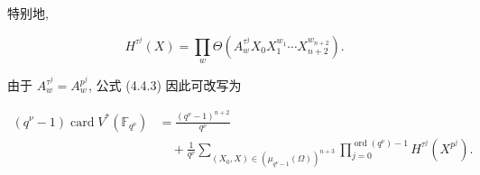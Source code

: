 特别地,

\[
H^{\tau^j}(X)=\prod_w
\Theta\!\left(A_w^{\tau^j}X_0X_1^{w_1}\cdots
X_{n+2}^{w_{n+2}}\right).
\]

由于 $A_w^{\tau^j}=A_w^{p^j}$, 公式 (4.4.3) 因此可改写为

\begin{equation}\tag{4.4.6}
\begin{aligned}
(q^\nu-1)\operatorname{card}V^*(\mathbb F_{q^\nu})
&=\frac{(q^\nu-1)^{n+2}}{q^\nu}\\
&\quad+\frac1{q^\nu}
\sum_{(X_0,X)\in(\mu_{q^\nu-1}(\Omega))^{n+3}}
\prod_{j=0}^{\operatorname{ord}(q^\nu)-1}H^{\tau^j}(X^{p^j}).
\end{aligned}
\end{equation}
